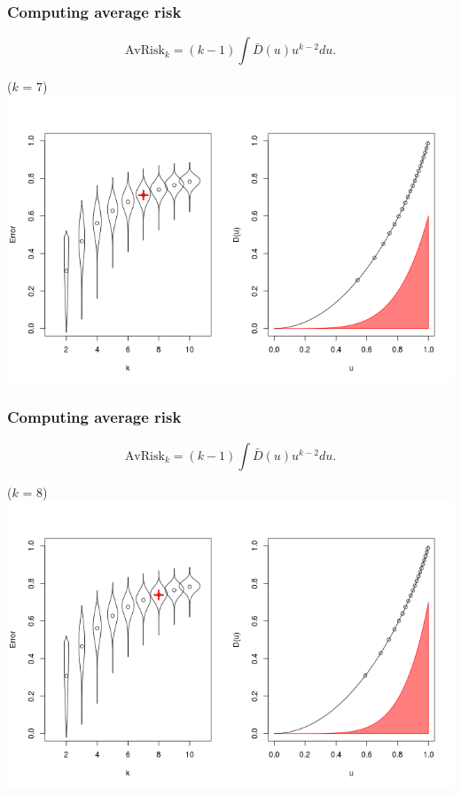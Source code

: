 \documentclass{beamer}
\begin{document}
\begin{frame}
\frametitle{Computing average risk}
\[
\text{AvRisk}_k = (k-1) \int \bar{D}(u) u^{k-2} du.
\]
\begin{center}
($k$ = 7)
\includegraphics[scale = 0.4, clip=true, trim=0 0.1in 0 0.7in]{../extrapolation/rho_0_7_fmla7.png}
\end{center}
\end{frame}

\begin{frame}
\frametitle{Computing average risk}
\[
\text{AvRisk}_k = (k-1) \int \bar{D}(u) u^{k-2} du.
\]
\begin{center}
($k$ = 8)
\includegraphics[scale = 0.4, clip=true, trim=0 0.1in 0 0.7in]{../extrapolation/rho_0_7_fmla8.png}
\end{center}
\end{frame}
\end{document}
